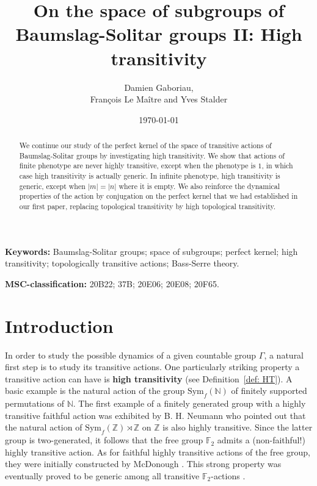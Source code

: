 \documentclass[12pt]{article}
\author{
	Damien Gaboriau, \\
	François Le Maître and Yves Stalder
}
\title{On the space of subgroups of Baumslag-Solitar groups II: High transitivity}
\date{\today}
\numberwithin{equation}{section}
\theoremstyle{definition}
\newcommand{\N}{\mathbb{N}}
\newcommand{\Z}{\mathbb{Z}}
\newcommand{\Sym}{\mathrm{Sym}}
\begin{document}
\maketitle
\begin{abstract}
    We continue our study of the perfect kernel of the space of transitive actions of Baumslag-Solitar
    groups by investigating high transitivity.
    We show that actions of finite phenotype are never highly transitive,
    except when the phenotype is $1$, in which case high transitivity is actually generic. 
    In infinite phenotype, high transitivity is generic, except 
    when $\lvert m \rvert= \lvert n\rvert$ %
    where it is empty.
    We also reinforce the dynamical properties of the action by conjugation on the perfect kernel that we had established in our first paper, replacing topological transitivity by high topological transitivity.
\end{abstract}
{
		\small	
		\noindent\textbf{{Keywords:}} Baumslag-Solitar groups; space of subgroups; perfect kernel; high transitivity; topologically transitive actions; Bass-Serre theory.
	}
	
	\smallskip
	
	{
		\small	
		\noindent\textbf{{MSC-classification:}}	
		20B22; 37B; 20E06; 20E08; 20F65.
	}

\tableofcontents
\section{Introduction}








In order to study the possible dynamics of a given countable group \(\Gamma\), a natural first 
step is to study its transitive actions.
One particularly striking property a transitive action can have is \textbf{high transitivity} (see Definition~\ref{def: HT}). 
A basic example is the natural action of the group $\Sym_f(\N)$ of finitely supported permutations of \(\N\). 
The first example of a finitely generated group with a highly transitive faithful action was exhibited by B. H. Neumann who pointed out that the natural action of 
$\Sym_f(\Z)\rtimes\Z$ on $\Z$ is also highly transitive. Since the latter group is two-generated,
it follows that the free group $\mathbb F_2$ admits a (non-faithful!) highly transitive action. 
As for faithful highly transitive actions of the free group, they were initially constructed by McDonough
\cite{mcdonoughPermutationRepresentationFree1977}.
This strong property was eventually proved to be generic among all transitive $\mathbb F_2$-actions \cite{dixon_most_1990}. 
\end{document}
